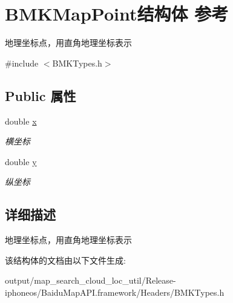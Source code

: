 \hypertarget{struct_b_m_k_map_point}{}\section{B\+M\+K\+Map\+Point结构体 参考}
\label{struct_b_m_k_map_point}


地理坐标点，用直角地理坐标表示  




{\ttfamily \#include $<$B\+M\+K\+Types.\+h$>$}

\subsection*{Public 属性}
\begin{DoxyCompactItemize}
\item 
\hypertarget{struct_b_m_k_map_point_a8c0ca1c3f0cbb5fe183ae7745781d8fb}{}double \hyperlink{struct_b_m_k_map_point_a8c0ca1c3f0cbb5fe183ae7745781d8fb}{x}\label{struct_b_m_k_map_point_a8c0ca1c3f0cbb5fe183ae7745781d8fb}

\begin{DoxyCompactList}\small\item\em 横坐标 \end{DoxyCompactList}\item 
\hypertarget{struct_b_m_k_map_point_a9d0aff0bad009459af85d1e51a194341}{}double \hyperlink{struct_b_m_k_map_point_a9d0aff0bad009459af85d1e51a194341}{y}\label{struct_b_m_k_map_point_a9d0aff0bad009459af85d1e51a194341}

\begin{DoxyCompactList}\small\item\em 纵坐标 \end{DoxyCompactList}\end{DoxyCompactItemize}


\subsection{详细描述}
地理坐标点，用直角地理坐标表示 

该结构体的文档由以下文件生成\+:\begin{DoxyCompactItemize}
\item 
output/map\+\_\+search\+\_\+cloud\+\_\+loc\+\_\+util/\+Release-\/iphoneos/\+Baidu\+Map\+A\+P\+I.\+framework/\+Headers/B\+M\+K\+Types.\+h\end{DoxyCompactItemize}
